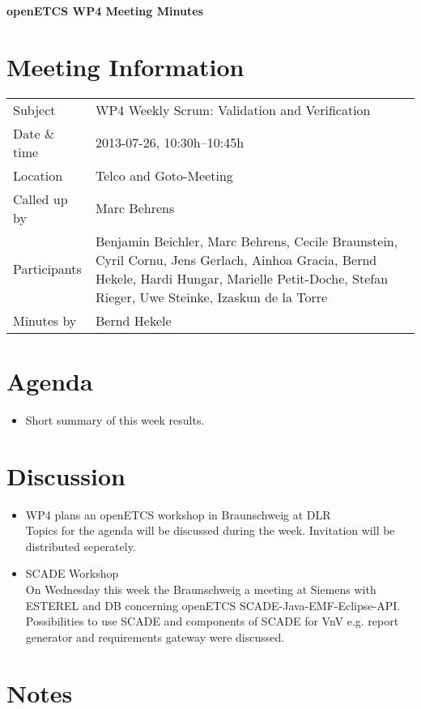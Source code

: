 \documentclass[a4paper, 11pt]{article}
\begin{document}
{\begin{center}\huge\bf openETCS WP4 Meeting Minutes\end{center}}
\section{Meeting Information}

\renewcommand{\arraystretch}{1.5}
\begin{supertabular}{m{.2\textwidth}m{.8\textwidth}}
Subject & WP4 Weekly Scrum: Validation and Verification\\
Date \& time & 2013-07-26, 10:30h--10:45h\\
Location & Telco and Goto-Meeting\\
Called up by & Marc Behrens\\
Participants &
Benjamin Beichler,
Marc Behrens,
Cecile Braunstein,
Cyril Cornu,
Jens Gerlach,
Ainhoa Gracia,
Bernd Hekele,
Hardi Hungar,
Marielle Petit-Doche,
Stefan Rieger,
Uwe Steinke,
Izaskun de la Torre
\\

Minutes by & Bernd Hekele\\

\end{supertabular}
\renewcommand{\arraystretch}{1.0}


\section{{Agenda}}
\begin{itemize}
\item Short summary of this week results.
\end{itemize}

\section{Discussion}

\begin{itemize}
\item WP4 plans an openETCS workshop in Braunschweig at DLR\\
Topics for the agenda will be discussed during the week. Invitation will be distributed seperately.

\item SCADE Workshop\\
On Wednesday this week the Braunschweig a meeting at Siemens with ESTEREL and DB concerning openETCS SCADE-Java-EMF-Eclipse-API.  Possibilities to use SCADE and components of SCADE for VnV e.g. report generator and requirements gateway were discussed.


\end{itemize}


\section{Notes}
\end{document}
